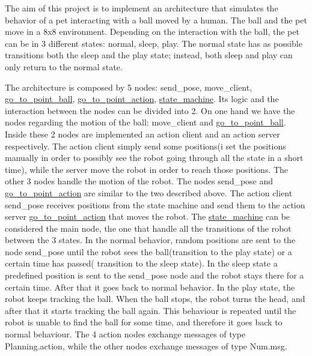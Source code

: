 The aim of this project is to implement an architecture that simulates the behavior of a pet interacting with a ball moved by a human. The ball and the pet move in a 8x8 environment. Depending on the interaction with the ball, the pet can be in 3 different states\+: normal, sleep, play. The normal state has as possible transitions both the sleep and the play state; instead, both sleep and play can only return to the normal state.

The architecture is composed by 5 nodes\+: send\+\_\+pose, move\+\_\+client, \mbox{\hyperlink{namespacego__to__point__ball}{go\+\_\+to\+\_\+point\+\_\+ball}}, \mbox{\hyperlink{namespacego__to__point__action}{go\+\_\+to\+\_\+point\+\_\+action}}, \mbox{\hyperlink{namespacestate__machine}{state\+\_\+machine}}. Its logic and the interaction between the nodes can be divided into 2. On one hand we have the nodes regarding the motion of the ball\+: move\+\_\+client and \mbox{\hyperlink{namespacego__to__point__ball}{go\+\_\+to\+\_\+point\+\_\+ball}}. Inside these 2 nodes are implemented an action client and an action server respectively. The action client simply send some positions(i set the positions manually in order to possibly see the robot going through all the state in a short time), while the server move the robot in order to reach those positions. The other 3 nodes handle the motion of the robot. The nodes send\+\_\+pose and \mbox{\hyperlink{namespacego__to__point__action}{go\+\_\+to\+\_\+point\+\_\+action}} are similar to the two described above. The action client send\+\_\+pose receives positions from the state machine and send them to the action server \mbox{\hyperlink{namespacego__to__point__action}{go\+\_\+to\+\_\+point\+\_\+action}} that moves the robot. The \mbox{\hyperlink{namespacestate__machine}{state\+\_\+machine}} can be considered the main node, the one that handle all the transitions of the robot between the 3 states. In the normal behavior, random positions are sent to the node send\+\_\+pose until the robot sees the ball(transition to the play state) or a certain time has passed( transition to the sleep state). In the sleep state a predefined position is sent to the send\+\_\+pose node and the robot stays there for a certain time. After that it goes back to normal behavior. In the play state, the robot keeps tracking the ball. When the ball stops, the robot turns the head, and after that it starts tracking the ball again. This behaviour is repeated until the robot is unable to find the ball for some time, and therefore it goes back to normal behaviour. The 4 action nodes exchange messages of type Planning.\+action, while the other nodes exchange messages of type Num.\+msg.

